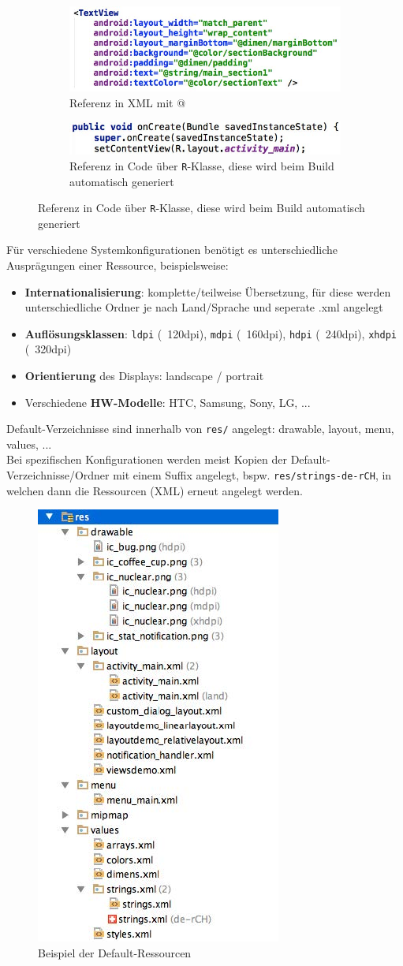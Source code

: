 \documentclass[a4paper]{article}
\begin{document}
\begin{figure}[htb!]
	\centering
	\begin{subfigure}{0.5\textwidth}
		\centering
		\includegraphics[width=0.8\linewidth]{img/references_xml.jpg}
		\caption{Referenz in XML mit @}
	\end{subfigure}%
	\begin{subfigure}{0.5\textwidth}
		\centering
		\includegraphics[width=0.8\linewidth]{img/references_code.jpg}
		\caption{Referenz in Code über \texttt{R}-Klasse, diese wird beim Build automatisch generiert}
	\end{subfigure}
\end{figure}
\noindent
Für verschiedene Systemkonfigurationen benötigt es unterschiedliche Ausprägungen einer Ressource, beispielsweise:
\begin{itemize}
	\item \textbf{Internationalisierung}: komplette/teilweise Übersetzung, für diese werden unterschiedliche Ordner je nach Land/Sprache und seperate .xml angelegt
	\item \textbf{Auflösungsklassen}: \texttt{ldpi} (~120dpi), \texttt{mdpi} (~160dpi), \texttt{hdpi} (~240dpi), \texttt{xhdpi} (~320dpi) 
	\item \textbf{Orientierung} des Displays: landscape / portrait
	\item Verschiedene \textbf{HW-Modelle}: HTC, Samsung, Sony, LG, ...
\end{itemize}
Default-Verzeichnisse sind innerhalb von \texttt{res/} angelegt: drawable, layout, menu, values, ...\\
Bei spezifischen Konfigurationen werden meist Kopien der Default-Verzeichnisse/Ordner mit einem Suffix angelegt, bspw. \texttt{res/strings-de-rCH}, in welchen dann die Ressourcen (XML) erneut angelegt werden.
\begin{figure}[htb!]
	\centering
	\includegraphics[width=0.3\linewidth]{img/ressources.jpg}
	\caption{Beispiel der Default-Ressourcen}
\end{figure}
\end{document}
